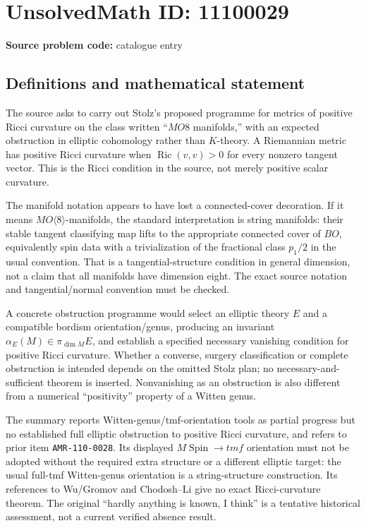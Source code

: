 \documentclass[11pt]{article}
\begin{document}
\section*{UnsolvedMath ID: 11100029}
\textbf{Source problem code:} catalogue entry
\subsection{Definitions and mathematical statement}
The source asks to carry out Stolz's proposed programme for metrics of positive Ricci curvature on the class written ``\(MO8\) manifolds,'' with an expected obstruction in elliptic cohomology rather than \(K\)-theory. A Riemannian metric has positive Ricci curvature when \(\operatorname{Ric}(v,v)>0\) for every nonzero tangent vector. This is the Ricci condition in the source, not merely positive scalar curvature.

The manifold notation appears to have lost a connected-cover decoration. If it means \(MO\langle8\rangle\)-manifolds, the standard interpretation is string manifolds: their stable tangent classifying map lifts to the appropriate connected cover of \(BO\), equivalently spin data with a trivialization of the fractional class \(p_1/2\) in the usual convention. That is a tangential-structure condition in general dimension, not a claim that all manifolds have dimension eight. The exact source notation and tangential/normal convention must be checked.

A concrete obstruction programme would select an elliptic theory \(E\) and a compatible bordism orientation/genus, producing an invariant \(\alpha_E(M)\in\pi_{\dim M}E\), and establish a specified necessary vanishing condition for positive Ricci curvature. Whether a converse, surgery classification or complete obstruction is intended depends on the omitted Stolz plan; no necessary-and-sufficient theorem is inserted. Nonvanishing as an obstruction is also different from a numerical ``positivity'' property of a Witten genus.

The summary reports Witten-genus/tmf-orientation tools as partial progress but no established full elliptic obstruction to positive Ricci curvature, and refers to prior item \texttt{AMR-110-0028}. Its displayed \(M\operatorname{Spin}\to tmf\) orientation must not be adopted without the required extra structure or a different elliptic target: the usual full-tmf Witten-genus orientation is a string-structure construction. Its references to Wu/Gromov and Chodosh--Li give no exact Ricci-curvature theorem. The original ``hardly anything is known, I think'' is a tentative historical assessment, not a current verified absence result.
\end{document}

